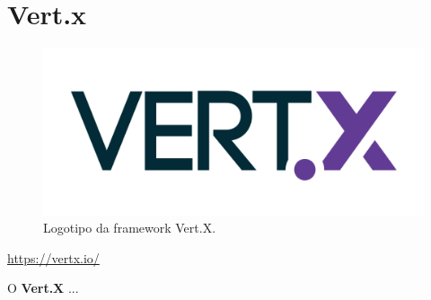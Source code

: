\section{Vert.x}
\label{subsec:vertx}

\begin{figure}[H]
    \centering
    \includegraphics[scale=0.08]{images/vertx.png}
    \caption{Logotipo da framework Vert.X.}
    \label{fig:vertx}
\end{figure}

\href{https://vertx.io/}{https://vertx.io/}

\hspace{5mm} O \textbf{Vert.X} ...